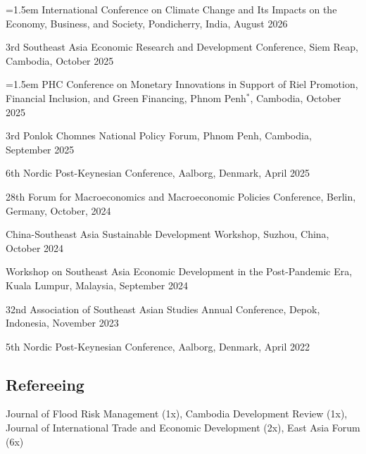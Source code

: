 \documentclass[10pt,a4paper]{article}
\begin{document}



\hangindent=1.5em
International Conference on Climate Change and Its Impacts on the Economy, Business, and Society,
Pondicherry, India, August 2026


3rd Southeast Asia Economic Research and Development Conference, Siem Reap, Cambodia, October 2025


\hangindent=1.5em
PHC Conference on Monetary Innovations in Support of Riel Promotion, Financial Inclusion, and Green Financing, Phnom Penh$^\ast$, Cambodia, October 2025

3rd Ponlok Chomnes National Policy Forum, Phnom Penh, Cambodia, September 2025

 

6th Nordic Post-Keynesian Conference, Aalborg, Denmark, April 2025

28th Forum for Macroeconomics and Macroeconomic Policies Conference, Berlin, Germany, October, 2024

China-Southeast Asia Sustainable Development Workshop, Suzhou, China, October 2024

Workshop on Southeast Asia Economic Development in the Post-Pandemic Era, Kuala Lumpur, Malaysia, September 2024



32nd Association of Southeast Asian Studies Annual Conference, Depok, Indonesia, November 2023



5th Nordic Post-Keynesian Conference, Aalborg, Denmark, April 2022




\subsection*{Refereeing}

Journal of Flood Risk Management (1x), Cambodia Development Review (1x), Journal of International Trade and Economic Development (2x), East Asia Forum (6x)
\end{document}
